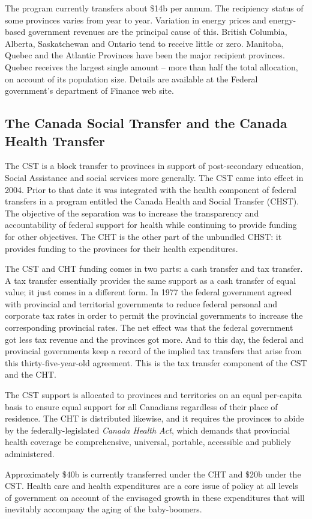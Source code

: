 The program currently transfers about \$14b per annum. The recipiency status of some provinces varies from year to year. Variation in energy prices and energy-based government revenues are the principal cause of this. British Columbia, Alberta, Saskatchewan and Ontario tend to receive little or zero. Manitoba, Quebec and the Atlantic Provinces have been the major recipient provinces. Quebec receives the largest single amount -- more than half the total allocation, on account of its population size. Details are available at the Federal government's department of Finance web site.

\subsection*{The Canada Social Transfer and the Canada Health Transfer}

The CST is a block transfer to provinces in support of post-secondary education, Social Assistance and social services more generally. The CST came into effect in 2004. Prior to that date it was integrated with the health component of federal transfers in a program entitled the Canada Health and Social Transfer (CHST). The objective of the separation was to increase the transparency and accountability of federal support for health while continuing to provide funding for other objectives. The CHT is the other part of the unbundled CHST: it provides funding to the provinces for their health expenditures.

The CST and CHT funding comes in two parts: a cash transfer and tax transfer. A tax transfer essentially provides the same support as a cash transfer of equal value; it just comes in a different form. In 1977 the federal government agreed with provincial and territorial governments to reduce federal personal and corporate tax rates in order to permit the provincial governments to increase the corresponding provincial rates. The net effect was that the federal government got less tax revenue and the provinces got more. And to this day, the federal and provincial governments keep a record of the implied tax transfers that arise from this thirty-five-year-old agreement. This is the tax transfer component of the CST and the CHT. 

The CST support is allocated to provinces and territories on an equal per-capita basis to ensure equal support for all Canadians regardless of their place of residence. The CHT is distributed likewise, and it requires the provinces to abide by the federally-legislated \textit{Canada Health Act}, which demands that provincial health coverage be comprehensive, universal, portable, accessible and publicly administered. 

Approximately \$40b is currently transferred under the CHT and \$20b under the CST. Health care and health expenditures are a core issue of policy at all levels of government on account of the envisaged growth in these expenditures that will inevitably accompany the aging of the baby-boomers. 
